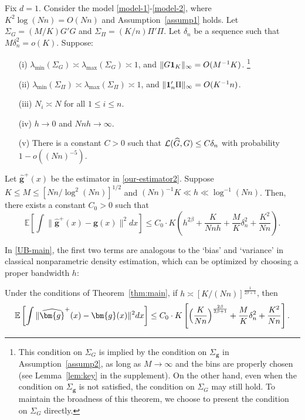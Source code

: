 \documentclass[preprint,11pt]{article}
\newcommand{\mbb}{\mathbb}
\numberwithin{equation}{section}
\newcommand{\beq}{\begin{equation}}
\newcommand{\eeq}{\end{equation}}
\begin{document}
\begin{thm} \label{thm:main}
Fix $d=1$. Consider the model \eqref{model-1}-\eqref{model-2}, where $K^2\log(Nn)=O(Nn)$ and Assumption~\ref{assump1} holds. Let $\Sigma_G = (M/K)G'G$ and $\Sigma_\Pi = (K/n)\Pi'\Pi$. Let $\delta_n$ be a sequence such that $M\delta_n^2=o(K)$. Suppose:
 \begin{itemize}
 \item[(i)] $\lambda_{\min}(\Sigma_G)\asymp \lambda_{\max}(\Sigma_G)\asymp 1$, and $\|G{\bf 1}_K\|_\infty = O(M^{-1}K)$. \footnote{This condition on $\Sigma_G$ is implied by the condition on $\Sigma_{\boldsymbol g}$ in Assumption~\ref{assump2}, as long as $M\to\infty$ and the bins are properly chosen (see Lemma~\ref{lem:key} in the supplement). On the other hand, even when the condition on $\Sigma_{\boldsymbol g}$ is not satisfied, the condition on $\Sigma_G$ may still hold. To maintain the broadness of this theorem, we choose to present the condition on $\Sigma_G$ directly.}
 \item[(ii)] $\lambda_{\min}(\Sigma_\Pi)\asymp \lambda_{\max}(\Sigma_\Pi)\asymp 1$, and $\|{\bf 1}_n'\Pi\|_\infty =O(K^{-1}n)$. 
 \item[(iii)] $N_i\asymp N$ for all $1\leq i\leq n$. 
 \item[(iv)] $h \to 0$ and $Nnh \to \infty$.
 \item[(v)] There is a constant $C>0$ such that  ${\cal L}(\widehat{G}, G)\leq C\delta_n$ with probability $1-o((Nn)^{-5})$.
 \end{itemize}
Let $\widehat{\boldsymbol g}^+(x)$ be the estimator in \eqref{our-estimator2}. Suppose $K\leq M\leq [Nn/\log^2(Nn)]^{1/2}$ and $ (Nn)^{-1}K\ll h\ll \log^{-1}(Nn)$. 
    Then, there exists a constant $C_0>0$ such that 
\beq \label{UB-main}
\mbb{E}\left[\int \|\widehat{\bm{g}}^+(x)-\bm{g}(x)\|^2dx\right]\le C_0 \cdot K\left( h^{2\beta}  + \frac{K}{Nnh}+\frac{M}{K}\delta_n^2  +  \frac{K^2}{Nn} \right). 
\eeq
\end{thm}

In \eqref{UB-main}, the first two terms are analogous to the `bias' and `variance' in classical nonparametric density estimation, which can be optimized by choosing a proper bandwidth $h$:
\begin{cor} \label{cor:rate1}
Under the conditions of Theorem~\ref{thm:main}, if $h\asymp [K/(Nn)]^{\frac{1}{2\beta+1}}$, then
\[
\mbb{E}\left[\int \|\widehat{\bm{g}}^+(x)-\bm{g}(x)\|^2dx\right]\le C_0 \cdot K \left[\Bigl(\frac{K}{Nn}\Bigr)^{\frac{2\beta}{2\beta+1}}+\frac{M}{K}\delta_n^2  +  \frac{K^2}{Nn} \right]. 
\]
\end{cor}
\end{document}
